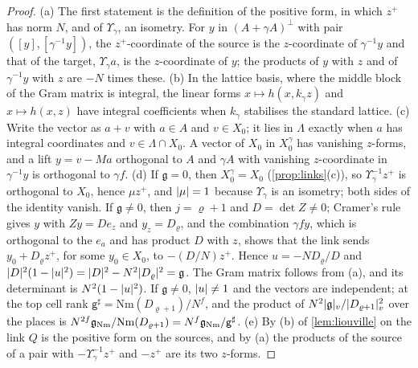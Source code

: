 \begin{proof}
(a) The first statement is the definition of the positive form, in which $z^+$ has norm $N$, and of $\Upsilon_\gamma$, an isometry. For $y$ in $(A+\gamma A)^\perp$ with pair $([y],[\gamma^{-1}y])$, the $z^+$-coordinate of the source
is the $z$-coordinate of $\gamma^{-1}y$ and that of the target, $\Upsilon_\gamma a$, is the $z$-coordinate of $y$; the products of $y$ with $z$ and of $\gamma^{-1}y$ with $z$ are $-N$ times these. (b) In the lattice basis, where the middle
block of the Gram matrix is integral, the linear forms $x\mapsto h(x,k_\gamma z)$ and $x\mapsto h(x,z)$ have integral coefficients when $k_\gamma$ stabilises the standard lattice. (c) Write the vector as $a+v$ with $a\in A$ and
$v\in X_0$; it lies in $\Lambda$ exactly when $a$ has integral coordinates and $v\in\Lambda\cap X_0$. A vector of $X_0$ in $X_0^\gamma$ has vanishing $z$-forms, and a lift $y=v-Ma$ orthogonal to $A$ and $\gamma A$ with
vanishing $z$-coordinate in $\gamma^{-1}y$ is orthogonal to $\gamma f$. (d) If $\mathfrak g=0$, then $X_0^\gamma=X_0$ (\cref{prop:links}(c)), so $\Upsilon_\gamma^{-1}z^+$ is orthogonal to $X_0$, hence $\mu z^+$, and $\lvert \mu\rvert=1$ because $\Upsilon_\gamma$ is an isometry; both sides of the identity
vanish. If $\mathfrak g\ne0$, then $j=\varrho+1$ and $D=\det Z\ne0$; Cramer's rule gives $y$ with $Zy=De_z$ and $y_z=D_\varrho$, and the combination $\gamma fy$, which is orthogonal to the $e_a$ and has product $D$ with
$z$, shows that the link sends $y_0+D_\varrho z^+$, for some $y_0\in X_0$, to $-(D/N)z^+$. Hence $u=-ND_\varrho/D$ and $\lvert D\rvert^2(1-\lvert u\rvert^2)=\lvert D\rvert^2-N^2\lvert D_\varrho\rvert^2=\mathfrak g$. The Gram matrix follows from (a), and its determinant is
$N^2(1-\lvert u\rvert^2)$. If $\mathfrak g\ne0$, $\lvert u\rvert\ne1$ and the vectors are independent; at the top cell rank
$\mathsf g^\sharp=\mathrm{Nm}(D_{\varrho+1})/N^f$, and the product of $N^2\lvert \mathfrak g\rvert_v/\lvert D_{\varrho+1}\rvert_v^2$ over the places is $N^{2f}\mathfrak g_{\rm Nm}/\mathrm{Nm}(D_{\varrho+1})=N^f\mathfrak g_{\rm Nm}/\mathsf g^\sharp$. (e) By (b) of \cref{lem:liouville}
on the link $Q$ is the positive form on the sources, and by (a) the products of the source of a pair with $-\Upsilon_\gamma^{-1}z^+$ and $-z^+$ are its two $z$-forms.
\end{proof}

